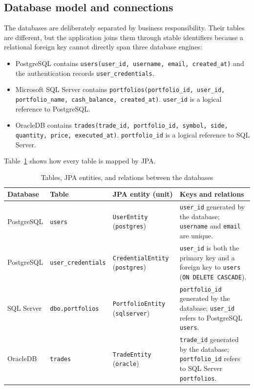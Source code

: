 \documentclass[12pt,a4paper]{article}
\newcommand{\code}[1]{\texttt{\small #1}}
\begin{document}
\subsection{Database model and connections}

The databases are deliberately separated by business responsibility. Their
tables are different, but the application joins them through stable
identifiers because a relational foreign key cannot directly span three
database engines:

\begin{itemize}
    \item PostgreSQL contains \code{users(user\_id, username, email,
    created\_at)} and the authentication records
    \code{user\_credentials}.
    \item Microsoft SQL Server contains
    \code{portfolios(portfolio\_id, user\_id, portfolio\_name,
    cash\_balance, created\_at)}. \code{user\_id} is a logical reference to
    PostgreSQL.
    \item OracleDB contains
    \code{trades(trade\_id, portfolio\_id, symbol, side, quantity, price,
    executed\_at)}. \code{portfolio\_id} is a logical reference to SQL Server.
\end{itemize}

Table~\ref{tab:model} shows how every table is mapped by JPA.

\begin{table}[htbp]
\centering
\small
\begin{tabularx}{\textwidth}{>{\raggedright\arraybackslash}p{2.1cm}
                             >{\raggedright\arraybackslash}p{2.9cm}
                             >{\raggedright\arraybackslash}p{3.3cm}
                             >{\raggedright\arraybackslash}X}
\toprule
\textbf{Database} & \textbf{Table} & \textbf{JPA entity (unit)} &
\textbf{Keys and relations}\\
\midrule
PostgreSQL & \code{users} & \code{UserEntity} (\code{postgres}) &
\code{user\_id} generated by the database; \code{username} and \code{email}
are unique.\\
PostgreSQL & \code{user\_\allowbreak credentials} & \code{CredentialEntity}
(\code{postgres}) & \code{user\_id} is both the primary key and a foreign key
to \code{users} (\code{ON DELETE CASCADE}).\\
SQL Server & \code{dbo.portfolios} & \code{PortfolioEntity}
(\code{sqlserver}) & \code{portfolio\_id} generated by the database;
\code{user\_id} refers to PostgreSQL \code{users}.\\
OracleDB & \code{trades} & \code{TradeEntity} (\code{oracle}) &
\code{trade\_id} generated by the database; \code{portfolio\_id} refers to
SQL Server \code{portfolios}.\\
\bottomrule
\end{tabularx}
\caption{Tables, JPA entities, and relations between the databases}
\label{tab:model}
\end{table}
\end{document}
